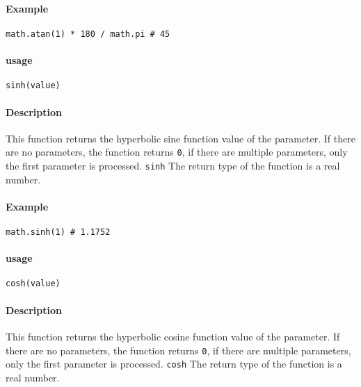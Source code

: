 \paragraph{Example}
\begin{lstlisting}[language=berry, numbers=none]
math.atan(1) * 180 / math.pi # 45
\end{lstlisting}


\paragraph{usage}
\begin{lstlisting}[language=berry, numbers=none]
sinh(value)
\end{lstlisting}

\paragraph{Description}
This function returns the hyperbolic sine function value of the parameter. If there are no parameters, the function returns \texttt{0}, if there are multiple parameters, only the first parameter is processed. \texttt{sinh} The return type of the function is a real number.

\paragraph{Example}
\begin{lstlisting}[language=berry, numbers=none]
math.sinh(1) # 1.1752
\end{lstlisting}


\paragraph{usage}
\begin{lstlisting}[language=berry, numbers=none]
cosh(value)
\end{lstlisting}

\paragraph{Description}
This function returns the hyperbolic cosine function value of the parameter. If there are no parameters, the function returns \texttt{0}, if there are multiple parameters, only the first parameter is processed. \texttt{cosh} The return type of the function is a real number.

